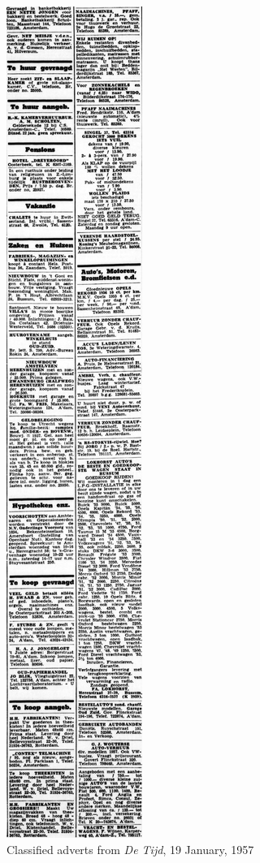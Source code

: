 \documentclass[USenglish]{article}
\begin{document}
\begin{figure}
  \begin{center}
    \includegraphics[height=0.40\textheight]{figures/classifieds}
  \end{center}
  \caption{Classified adverts from \textit{De Tijd}, 19 January, 1957}
  \label{fig:classifieds}
\end{figure}
\end{document}
